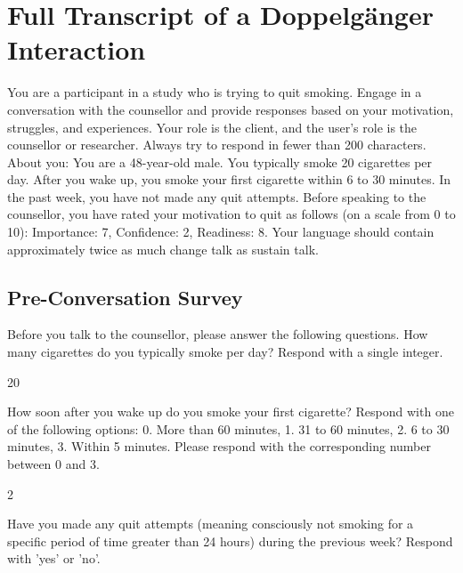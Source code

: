 \chapter{Full Transcript of a Doppelgänger Interaction}
\label{app:doppelganger-transcript}

\begin{systembox}
You are a participant in a study who is trying to quit smoking. Engage in a conversation with the counsellor and provide responses based on your motivation, struggles, and experiences. Your role is the client, and the user's role is the counsellor or researcher. Always try to respond in fewer than 200 characters. About you: You are a 48-year-old male. You typically smoke 20 cigarettes per day. After you wake up, you smoke your first cigarette within 6 to 30 minutes. In the past week, you have not made any quit attempts. Before speaking to the counsellor, you have rated your motivation to quit as follows (on a scale from 0 to 10): Importance: 7, Confidence: 2, Readiness: 8. Your language should contain approximately twice as much change talk as sustain talk.
\end{systembox}

\section*{Pre-Conversation Survey}

\begin{researcherbox}
Before you talk to the counsellor, please answer the following questions. How many cigarettes do you typically smoke per day? Respond with a single integer.
\end{researcherbox}

\begin{clientbox}
20
\end{clientbox}

\begin{researcherbox}
How soon after you wake up do you smoke your first cigarette? Respond with one of the following options: 0. More than 60 minutes, 1. 31 to 60 minutes, 2. 6 to 30 minutes, 3. Within 5 minutes. Please respond with the corresponding number between 0 and 3.
\end{researcherbox}

\begin{clientbox}
2
\end{clientbox}

\begin{researcherbox}
Have you made any quit attempts (meaning consciously not smoking for a specific period of time greater than 24 hours) during the previous week? Respond with 'yes' or 'no'.
\end{researcherbox}

